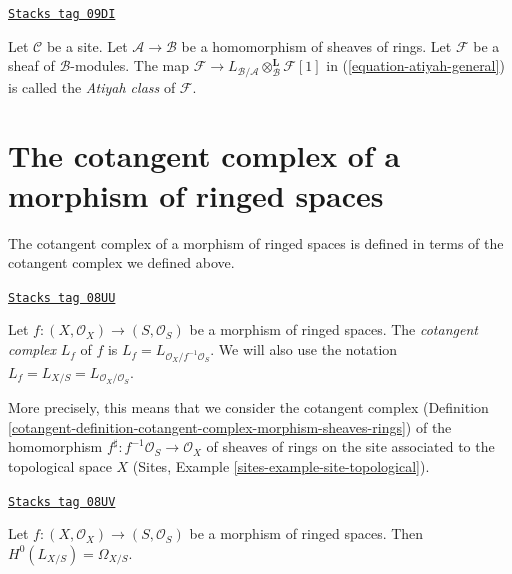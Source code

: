 \begin{definition}
\label{cotangent-definition-atiyah-class-general}
\href{https://stacks.math.columbia.edu/tag/09DI}{\texttt{Stacks tag 09DI}}

Let $\mathcal{C}$ be a site.
Let $\mathcal{A} \to \mathcal{B}$ be a homomorphism of sheaves of rings.
Let $\mathcal{F}$ be a sheaf of $\mathcal{B}$-modules.
The map $\mathcal{F} \to
L_{\mathcal{B}/\mathcal{A}} \otimes_\mathcal{B}^\mathbf{L} \mathcal{F}[1]$
in (\ref{equation-atiyah-general}) is called the {\it Atiyah class} of
$\mathcal{F}$.
\end{definition}

\section{The cotangent complex of a morphism of ringed spaces}
\label{cotangent-section-cotangent-morphism-ringed-spaces}
The cotangent complex of a morphism of ringed spaces is defined
in terms of the cotangent complex we defined above.

\begin{definition}
\label{cotangent-definition-cotangent-complex-morphism-ringed-spaces}
\href{https://stacks.math.columbia.edu/tag/08UU}{\texttt{Stacks tag 08UU}}

Let $f : (X, \mathcal{O}_X) \to (S, \mathcal{O}_S)$ be a morphism of
ringed spaces. The {\it cotangent complex} $L_f$ of $f$ is
$L_f = L_{\mathcal{O}_X/f^{-1}\mathcal{O}_S}$.
We will also use the notation
$L_f = L_{X/S} = L_{\mathcal{O}_X/\mathcal{O}_S}$.
\end{definition}

More precisely, this means that we consider the cotangent complex
(Definition \ref{cotangent-definition-cotangent-complex-morphism-sheaves-rings})
of the homomorphism $f^\sharp : f^{-1}\mathcal{O}_S \to \mathcal{O}_X$
of sheaves of rings on the site associated to the topological space $X$
(Sites, Example \ref{sites-example-site-topological}).

\begin{lemma}
\label{cotangent-lemma-H0-L-morphism-ringed-spaces}
\href{https://stacks.math.columbia.edu/tag/08UV}{\texttt{Stacks tag 08UV}}

Let $f : (X, \mathcal{O}_X) \to (S, \mathcal{O}_S)$ be a morphism of
ringed spaces. Then $H^0(L_{X/S}) = \Omega_{X/S}$.
\end{lemma}

